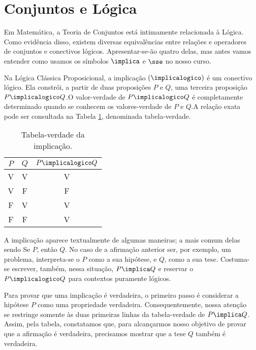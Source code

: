 \section{Conjuntos e Lógica}

Em Matemática, a Teoria de Conjuntos está intimamente relacionada à Lógica. Como evidência disso, existem diversas equivalências entre relações e operadores de conjuntos e conectivos lógicos. Apresentar-se-ão quatro delas, mas antes vamos entender como usamos os símbolos $\implica$ e $\sse$ no nosso curso.

Na Lógica Clássica Proposicional, a implicação $(\implicalogico)$ é um conectivo lógico. Ela constrói, a partir de duas proposições $P$ e $Q$, uma terceira proposição $P \implicalogico Q$.O valor-verdade de $P \implicalogico Q$ é completamente determinado quando se conhecem os valores-verdade de $P$ e $Q$.A relação exata pode ser consultada na Tabela \ref{tbl:implicacao}, denominada tabela-verdade.

\begin{table}[h]
	\centering
	\begin{tabular}{cc|c}
		$P$		& $Q$		& $P \implicalogico Q$ \\ \hline
		V		& V			& V			           \\
		V		& F			& F			           \\
		F		& V			& V			           \\
		F		& F			& V			           \\	
	\end{tabular}
	\caption{Tabela-verdade da implicação.}
	\label{tbl:implicacao}
\end{table}

A implicação aparece textualmente de algumas maneiras; a mais comum delas sendo \abreaspas Se $P$, então $Q$\fechaaspas.
No caso de a afirmação anterior ser, por exemplo, um problema, interpreta-se o $P$ como a sua hipótese, e $Q$, como a sua tese. Costuma-se escrever, também, nessa situação, $P \implica Q$ e reservar o $P \implicalogico Q$ para contextos puramente lógicos.

Para provar que uma implicação é verdadeira, o primeiro passo é considerar a hipótese $P$ como uma propriedade verdadeira.
Consequentemente, nossa atenção se restringe somente às duas primeiras linhas da tabela-verdade de $P \implica Q$.
Assim, pela tabela, constatamos que, para alcançarmos nosso objetivo de provar que a afirmação  é verdadeira, precisamos mostrar que a tese $Q$ também é verdadeira.


